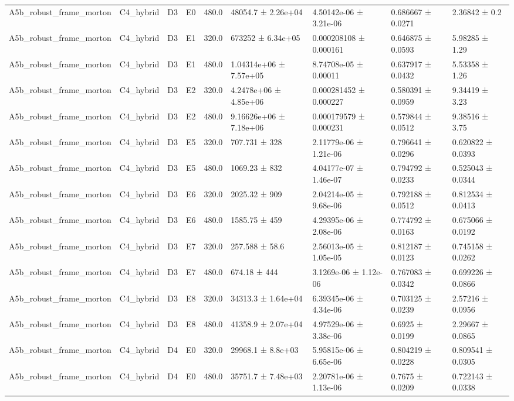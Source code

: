 \begin{table}
\begin{tabular}{lllllllll}
A5b\_robust\_frame\_morton & C4\_hybrid & D3 & E0 & 480.0 & 48054.7 ± 2.26e+04 & 4.50142e-06 ± 3.21e-06 & 0.686667 ± 0.0271 & 2.36842 ± 0.2 \\
A5b\_robust\_frame\_morton & C4\_hybrid & D3 & E1 & 320.0 & 673252 ± 6.34e+05 & 0.000208108 ± 0.000161 & 0.646875 ± 0.0593 & 5.98285 ± 1.29 \\
A5b\_robust\_frame\_morton & C4\_hybrid & D3 & E1 & 480.0 & 1.04314e+06 ± 7.57e+05 & 8.74708e-05 ± 0.00011 & 0.637917 ± 0.0432 & 5.53358 ± 1.26 \\
A5b\_robust\_frame\_morton & C4\_hybrid & D3 & E2 & 320.0 & 4.2478e+06 ± 4.85e+06 & 0.000281452 ± 0.000227 & 0.580391 ± 0.0959 & 9.34419 ± 3.23 \\
A5b\_robust\_frame\_morton & C4\_hybrid & D3 & E2 & 480.0 & 9.16626e+06 ± 7.18e+06 & 0.000179579 ± 0.000231 & 0.579844 ± 0.0512 & 9.38516 ± 3.75 \\
A5b\_robust\_frame\_morton & C4\_hybrid & D3 & E5 & 320.0 & 707.731 ± 328 & 2.11779e-06 ± 1.21e-06 & 0.796641 ± 0.0296 & 0.620822 ± 0.0393 \\
A5b\_robust\_frame\_morton & C4\_hybrid & D3 & E5 & 480.0 & 1069.23 ± 832 & 4.04177e-07 ± 1.46e-07 & 0.794792 ± 0.0233 & 0.525043 ± 0.0344 \\
A5b\_robust\_frame\_morton & C4\_hybrid & D3 & E6 & 320.0 & 2025.32 ± 909 & 2.04214e-05 ± 9.68e-06 & 0.792188 ± 0.0512 & 0.812534 ± 0.0413 \\
A5b\_robust\_frame\_morton & C4\_hybrid & D3 & E6 & 480.0 & 1585.75 ± 459 & 4.29395e-06 ± 2.08e-06 & 0.774792 ± 0.0163 & 0.675066 ± 0.0192 \\
A5b\_robust\_frame\_morton & C4\_hybrid & D3 & E7 & 320.0 & 257.588 ± 58.6 & 2.56013e-05 ± 1.05e-05 & 0.812187 ± 0.0123 & 0.745158 ± 0.0262 \\
A5b\_robust\_frame\_morton & C4\_hybrid & D3 & E7 & 480.0 & 674.18 ± 444 & 3.1269e-06 ± 1.12e-06 & 0.767083 ± 0.0342 & 0.699226 ± 0.0866 \\
A5b\_robust\_frame\_morton & C4\_hybrid & D3 & E8 & 320.0 & 34313.3 ± 1.64e+04 & 6.39345e-06 ± 4.34e-06 & 0.703125 ± 0.0239 & 2.57216 ± 0.0956 \\
A5b\_robust\_frame\_morton & C4\_hybrid & D3 & E8 & 480.0 & 41358.9 ± 2.07e+04 & 4.97529e-06 ± 3.38e-06 & 0.6925 ± 0.0199 & 2.29667 ± 0.0865 \\
A5b\_robust\_frame\_morton & C4\_hybrid & D4 & E0 & 320.0 & 29968.1 ± 8.8e+03 & 5.95815e-06 ± 6.65e-06 & 0.804219 ± 0.0228 & 0.809541 ± 0.0305 \\
A5b\_robust\_frame\_morton & C4\_hybrid & D4 & E0 & 480.0 & 35751.7 ± 7.48e+03 & 2.20781e-06 ± 1.13e-06 & 0.7675 ± 0.0209 & 0.722143 ± 0.0338 \\

\end{tabular}
\end{table}
